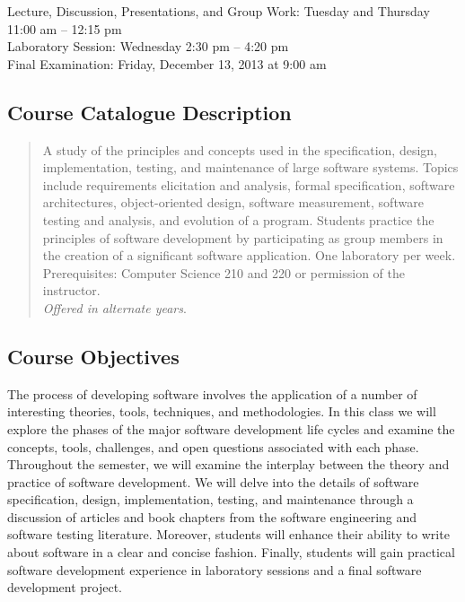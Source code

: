 Lecture, Discussion, Presentations, and Group Work: Tuesday and Thursday 11:00 am -- 12:15 pm \\
Laboratory Session: Wednesday 2:30 pm -- 4:20 pm \\
Final Examination: Friday, December 13, 2013 at 9:00 am


\subsection*{Course Catalogue Description}

\begin{quote}

	A study of the principles and concepts used in the specification, design, implementation, testing, and maintenance
	of large software systems. Topics include requirements elicitation and analysis, formal specification, software
	architectures, object-oriented design, software measurement, software testing and analysis, and evolution of a
	program.  Students practice the principles of software development by participating as group members in the creation
	of a significant software application. One laboratory per week. Prerequisites: Computer Science 210 and 220 or
	permission of the instructor. \\ {\em Offered in alternate years}.

\end{quote}

\subsection*{Course Objectives}

The process of developing software involves the application of a number of interesting theories, tools, techniques, and
methodologies.  In this class we will explore the phases of the major software development life cycles and examine the
concepts, tools, challenges, and open questions associated with each phase.  Throughout the semester, we will
examine the interplay between the theory and practice of software development.  We will delve into the details of
software specification, design, implementation, testing, and maintenance through a discussion of articles and book
chapters from the software engineering and software testing literature.  Moreover, students will enhance their ability
to write about software in a clear and concise fashion.  Finally, students will gain practical software development
experience in laboratory sessions and a final software development project.

